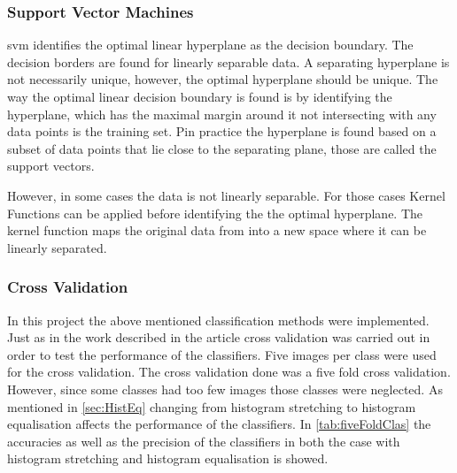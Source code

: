 \subsubsection*{Support Vector Machines}
\gls{svm} identifies the optimal linear hyperplane as the decision boundary. The decision borders are found for linearly separable data. A separating hyperplane is not necessarily unique, however, the optimal hyperplane should be unique. The way the optimal linear decision boundary is found is by identifying the hyperplane, which has the maximal margin around it not intersecting with any data points is the training set.
Pin practice the hyperplane is found based on a subset of data points that lie close to the separating plane, those are called the support vectors.    

However, in some cases the data is not linearly separable. For those cases Kernel Functions can be applied before identifying the the optimal hyperplane. The kernel function maps the original data from into a new space where it can be linearly separated.  

\subsubsection*{Cross Validation}
In this project the above mentioned classification methods were implemented. Just as in the work described in the article cross validation was carried out in order to test the performance of the classifiers. Five images per class were used for the cross validation. The cross validation done was a five fold cross validation. However, since some classes had too few images those classes were neglected. As mentioned in \autoref{sec:HistEq} changing from histogram stretching to histogram equalisation affects the performance of the classifiers. In \autoref{tab:fiveFoldClas} the accuracies as well as the precision of the classifiers in both the case with histogram stretching and histogram equalisation is showed.  

